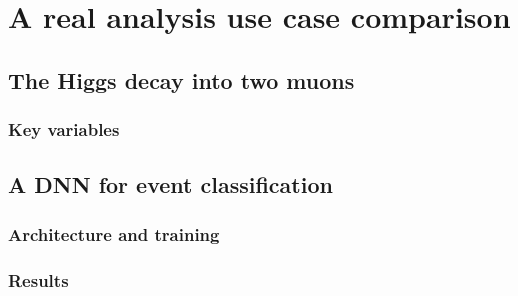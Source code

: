 \chapter{A real analysis use case comparison}\label{ch:benan} %

\section{The Higgs decay into two muons}

\subsection{Key variables}

\section{A DNN for event classification}

\subsection{Architecture and training}

\subsection{Results}

